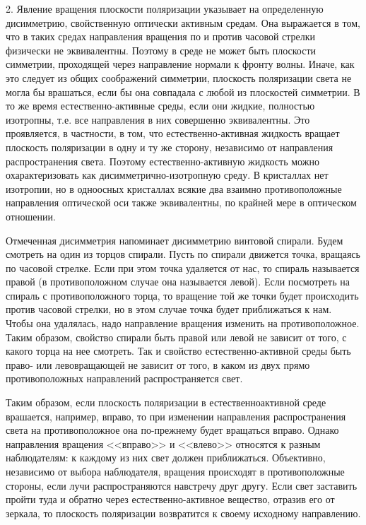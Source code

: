 \documentclass[14pt]{article}
\begin{document}
2. Явление вращения плоскости поляризации указывает на определенную дисимметрию, свойственную оптически активным средам. Она выражается в том, что в таких средах направления вращения по и против часовой стрелки физически не эквивалентны. Поэтому в среде не может быть плоскости симметрии, проходящей через направление нормали к фронту волны. Иначе, как это следует из общих соображений симметрии, плоскость поляризации света не могла бы врашаться, если бы она совпадала с любой из плоскостей симметрии. В то же время естественно-активные среды, если они жидкие, полностью изотропны, т.е. все направления в них совершенно эквивалентны. Это проявляется, в частности, в том, что естественно-активная жидкость вращает плоскость поляризации в одну и ту же сторону, независимо от направления распространения света. Поэтому естественно-активную жидкость можно охарактеризовать как дисимметрично-изотропную среду. В кристаллах нет изотропии, но в одноосных кристаллах всякие два взаимно противоположные направления оптической оси также эквивалентны, по крайней мере в оптическом отношении.

Отмеченная дисимметрия напоминает дисимметрию винтовой спирали. Будем смотреть на один из торцов спирали. Пусть по спирали движется точка, вращаясь по часовой стрелке. Если
при этом точка удаляется от нас, то спираль называется правой (в противоположном случае она называется левой). Если посмотреть на спираль с противоположного торца, то вращение той же точки будет происходить против часовой стрелки, но в этом случае точка будет приближаться к нам. Чтобы она удалялась, надо направление вращения изменить на противоположное. Таким образом, свойство спирали быть правой или левой не зависит от того, с какого торца на нее смотреть. Так и свойство естественно-активной среды быть право- или левовращающей не зависит от того, в каком из двух прямо противоположных направлений распространяется свет.

Таким образом, если плоскость поляризации в естественноактивной среде врашается, например, вправо, то при изменении направления распространения света на противоположное
она по-прежнему будет вращаться вправо. Однако направления вращения <<вправо>> и <<влево>> относятся к разным наблюдателям: к каждому из них свет должен приближаться. Объективно, независимо от выбора наблюдателя, вращения происходят в противоположные стороны, если лучи распространяются навстречу друг другу. Если свет заставить пройти туда
и обратно через естественно-активное вещество, отразив его от зеркала, то плоскость поляризации возвратится к своему исходному направлению.
\end{document}
